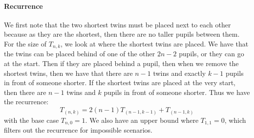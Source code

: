 \documentclass[]{article}
\begin{document}
\paragraph{Recurrence}
We first note that the two shortest twins must be placed next to each other because as they are the shortest, then there are no taller pupils between them. 
For the size of $T_{n, k}$, we look at where the shortest twins are placed. We have that the twins can be placed behind of one of the other $2n - 2$ pupils, or they can go at the start. Then if they are placed behind a pupil, then when we remove the shortest twins, then we have that there are $n-1$ twins and exactly $k-1$ pupils in front of someone shorter. If the shortest twins are placed at the very start, then there are $n-1$ twins and $k$ pupils in front of someone shorter. Thus we have the recurrence:
\begin{equation}
	T_{(n, k)} = 2(n-1) T_{(n-1, k-1)} + T_{(n-1, k)}
\end{equation}
with the base case $T_{n, 0} = 1$. We also have an upper bound where $T_{1, 1} = 0$, which filters out the recurrence for impossible scenarios. 
\newpage
\end{document}
